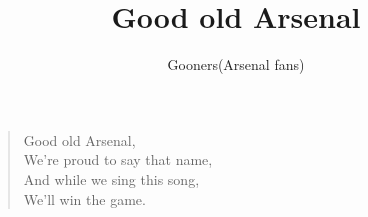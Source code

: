 \documentclass[a4paper,12pt]{article}
\title{Good old Arsenal}
\author{Gooners(Arsenal fans)}
\date{}
\begin{document}
	
	\maketitle
	
	\begin{verse}
		
		Good old Arsenal, \\
		We're proud to say that name, \\
		And while we sing this song, \\
		We'll win the game.
		
	\end{verse}
	
\end{document}
